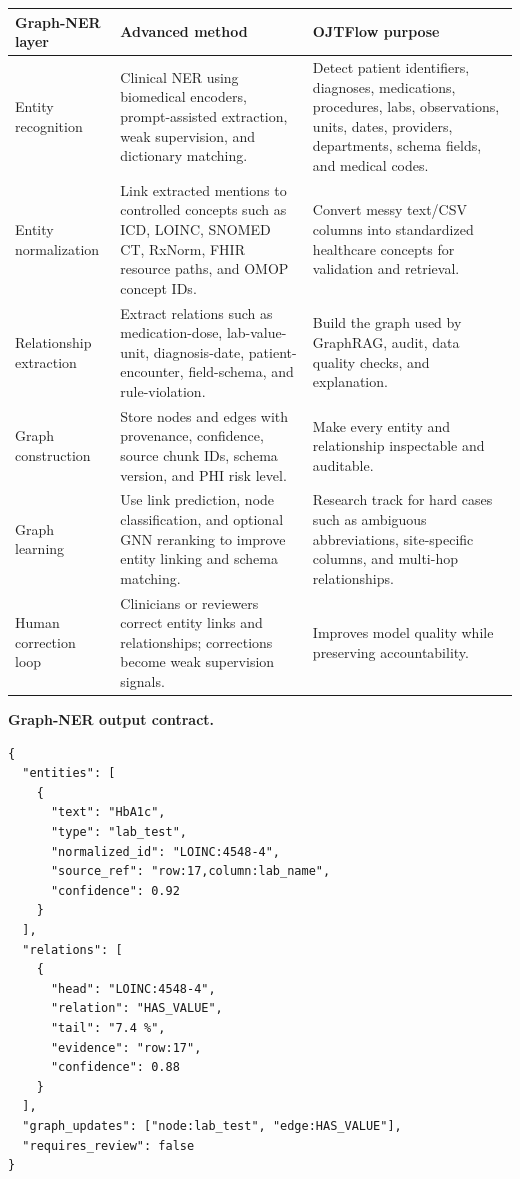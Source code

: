 \begin{longtable}{p{}p{}p{}}
\toprule
\textbf{Graph-NER layer} & \textbf{Advanced method} & \textbf{OJTFlow purpose} \\
\midrule
Entity recognition & Clinical NER using biomedical encoders, prompt-assisted extraction, weak supervision, and dictionary matching. & Detect patient identifiers, diagnoses, medications, procedures, labs, observations, units, dates, providers, departments, schema fields, and medical codes. \\
\addlinespace
Entity normalization & Link extracted mentions to controlled concepts such as ICD, LOINC, SNOMED CT, RxNorm, FHIR resource paths, and OMOP concept IDs. & Convert messy text/CSV columns into standardized healthcare concepts for validation and retrieval. \\
\addlinespace
Relationship extraction & Extract relations such as medication-dose, lab-value-unit, diagnosis-date, patient-encounter, field-schema, and rule-violation. & Build the graph used by GraphRAG, audit, data quality checks, and explanation. \\
\addlinespace
Graph construction & Store nodes and edges with provenance, confidence, source chunk IDs, schema version, and PHI risk level. & Make every entity and relationship inspectable and auditable. \\
\addlinespace
Graph learning & Use link prediction, node classification, and optional GNN reranking to improve entity linking and schema matching. & Research track for hard cases such as ambiguous abbreviations, site-specific columns, and multi-hop relationships. \\
\addlinespace
Human correction loop & Clinicians or reviewers correct entity links and relationships; corrections become weak supervision signals. & Improves model quality while preserving accountability. \\
\bottomrule
\end{longtable}

\textbf{Graph-NER output contract.}

\begin{verbatim}
{
  "entities": [
    {
      "text": "HbA1c",
      "type": "lab_test",
      "normalized_id": "LOINC:4548-4",
      "source_ref": "row:17,column:lab_name",
      "confidence": 0.92
    }
  ],
  "relations": [
    {
      "head": "LOINC:4548-4",
      "relation": "HAS_VALUE",
      "tail": "7.4 %",
      "evidence": "row:17",
      "confidence": 0.88
    }
  ],
  "graph_updates": ["node:lab_test", "edge:HAS_VALUE"],
  "requires_review": false
}
\end{verbatim}

